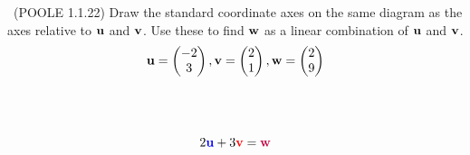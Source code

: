 \begin{problem}{\problemnum \, \textsf{(POOLE 1.1.22)}}
	Draw the standard coordinate axes on the same diagram as the axes relative to $\mathbf{u}$ and $\mathbf{v}$.
	Use these to find $\mathbf{w}$ as a linear combination of $\mathbf{u}$ and $\mathbf{v}$.
	\[ \mathbf{u} = \begin{pmatrix} -2 \\ 3 \end{pmatrix},
	   \mathbf{v} = \begin{pmatrix}  2 \\ 1 \end{pmatrix},
	   \mathbf{w} = \begin{pmatrix}  2 \\ 9 \end{pmatrix}
	\]
\end{problem}
\begin{solution}\\\\
\begin{center}
\end{center}
\[ 2{\color{blue}\mathbf{u}} + 3{\color{red}\mathbf{v}} = {\color{purple}\mathbf{w}} \]
\end{solution}
